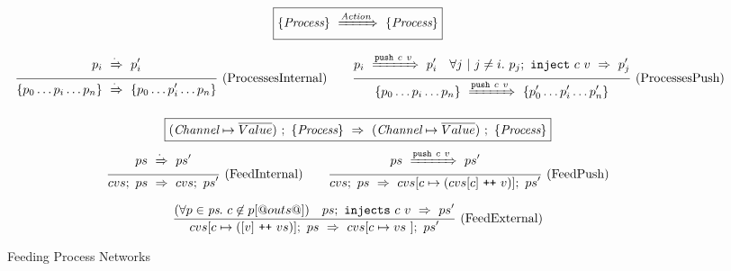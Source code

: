 
\begin{figure*}
\begin{minipage}[t]{1\textwidth}

$$
  \boxed{\{ \textit{Process} \}~\xRightarrow{\textit{Action}}~\{ \textit{Process} \}}
$$

$$
\ruleIN{
  \ProcShake{p_i}{\cdot}{p'_i}
}{
  \ProcsShake{
    \sgl{p_0 \ldots p_i \ldots p_n}
  }{\cdot}{
    \sgl{p_0 \ldots p'_i \ldots p_n}
  }
}{ProcessesInternal}
%
\quad
%
\ruleIN{
  \ProcShake{p_i}{\Push~c~v}{p'_i}
  \quad
  \forall j~|~j \neq i.~
  \ProcInject{p_j}{c}{v}{p'_j}
}{
  \ProcsShake{
    \sgl{p_0 \ldots p_i \ldots p_n}
  }{\Push~c~v}{
    \sgl{p'_0 \ldots p'_i \ldots p'_n}
  }
}{ProcessesPush}
$$


\vspace{1em}

\newcommand\vs {\ti{vs}}
\newcommand\accs {\ti{accs}}
\newcommand\network {\ti{ps}}

$$
  \boxed{
    (\textit{Channel} \mapsto \overline{Value})~;~\{ \textit{Process} \}~\Rightarrow~(\textit{Channel} \mapsto \overline{Value})~;~\{ \textit{Process} \}
  }
$$
$$
\ruleIN{
  \ProcsShake
    {ps}
    {\cdot}
    {ps'}
}{
  \ProcsFeed
    {cvs}
    {ps}
    {cvs}
    {ps'}
}{FeedInternal}
%
\quad
%
\ruleIN{
  \ProcsShake
    {ps}
    {\Push~c~v}
    {ps'}
}{
  \ProcsFeed
    {cvs}
    {ps}
    {cvs[c \mapsto (cvs[c] \listappend v)]}
    {ps'}
}{FeedPush}
$$




$$
\ruleIN{
  (\forall p \in \network.~c \not\in p[@outs@])
\quad
  \ProcsInject
    {ps}
    {c}
    {v}
    {ps'}
}{
  \ProcsFeed
    {cvs[c \mapsto ([v] \listappend vs)]}
    {ps}
    {cvs[c \mapsto vs~]}
    {ps'}
}{FeedExternal}
$$



\end{minipage}
\caption{Feeding Process Networks}
\label{fig:Process:Eval:Feed}
\end{figure*}

